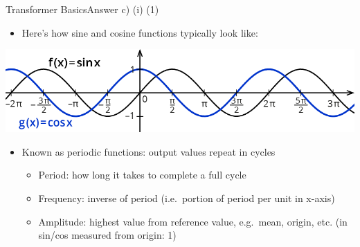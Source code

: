 \documentclass[t]{beamer}
\begin{document}
\begin{frame}{Transformer Basics}{Answer c) (i) (1)}
    \begin{itemize}
        \item Here's how sine and cosine functions typically look like:
    \end{itemize}
    \begin{center}
        \includegraphics[scale=0.7]{img/sin_cos_2.png}
    \end{center}
    \begin{itemize}
        \item Known as periodic functions: output values repeat in cycles
              \begin{itemize}
                  \item Period: how long it takes to complete a full cycle
                  \item Frequency: inverse of period (i.e.\ portion of period
                        per unit in x-axis)
                  \item Amplitude: highest value from reference value, e.g.\
                        mean, origin, etc. (in sin/cos measured from origin: 1)
              \end{itemize}
    \end{itemize}
\end{frame}
\end{document}
